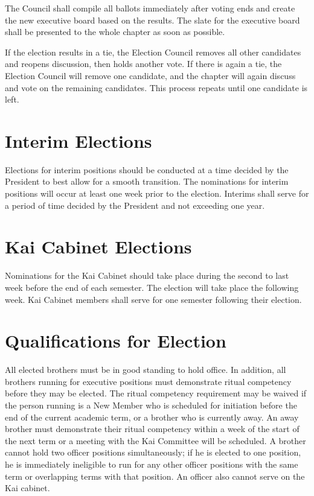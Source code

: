The Council shall compile all ballots immediately after voting ends and create
the new executive board based on the results.
The slate for the executive board shall be presented to the whole chapter as
soon as possible.

If the election results in a tie, the Election Council removes all other
candidates and reopens discussion, then holds another vote.
If there is again a tie, the Election Council will remove one candidate, and the
chapter will again discuss and vote on the remaining candidates.
This process repeats until one candidate is left.

\section{Interim Elections}
\label{sec:interim-elections}

Elections for interim positions should be conducted at a time decided by the
President to best allow for a smooth transition.
The nominations for interim positions will occur at least one week prior to the
election.
Interims shall serve for a period of time decided by the President and not
exceeding one year.

\section{Kai Cabinet Elections}
\label{sec:kai-cabinet-election-procedure}

Nominations for the Kai Cabinet should take place during the second to last week
before the end of each semester.
The election will take place the following week.
Kai Cabinet members shall serve for one semester following their election.

\section{Qualifications for Election}
\label{sec:qualifications-for-election}

All elected brothers must be in good standing to hold office.
In addition, all brothers running for executive positions must demonstrate
ritual competency before they may be elected.
The ritual competency requirement may be waived if the person running is a New
Member who is scheduled for initiation before the end of the current academic
term, or a brother who is currently away.
An away brother must demonstrate their ritual competency within a week of the
start of the next term or a meeting with the Kai Committee will be scheduled.
A brother cannot hold two officer positions simultaneously; if he is elected to
one position, he is immediately ineligible to run for any other officer
positions with the same term or overlapping terms with that position.
An officer also cannot serve on the Kai cabinet.

